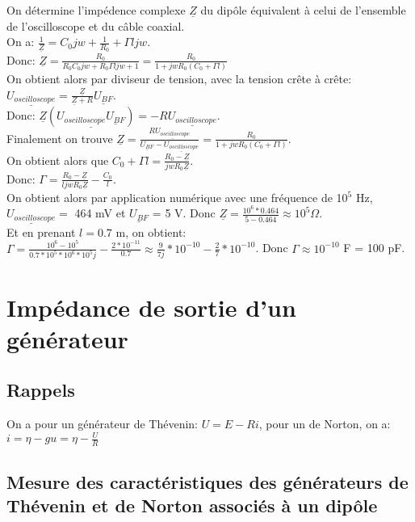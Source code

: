 \documentclass{scrartcl}
\begin{document}
				On détermine l'impédence complexe $\underline{Z}$ du dipôle équivalent à celui de l'ensemble de l'oscilloscope et du câble coaxial.\\
				On a: $\frac{1}{\underline{Z}} = C_0jw + \frac{1}{R_0} + \Gamma ljw$.\\
				Donc: $\underline{Z} = \frac{R_0}{R_0 C_0 jw + R_0 \Gamma ljw + 1} = \frac{R_0}{1 + jw R_0(C_0 + \Gamma l)}$\\
				On obtient alors par diviseur de tension, avec la tension crête à crête:\\
				$\underline{U_{oscilloscope}} = \frac{\underline{Z}}{\underline{Z} + R}\underline{U_{BF}}$.\\
				Donc: $\underline{Z}(\underline{U_{oscilloscope}\underline{U_{BF}}}) = -R\underline{U_{oscilloscope}}$.\\
				Finalement on trouve $\underline{Z} = \frac{R\underline{U_{oscilloscope}}}{\underline{U_{BF}} - \underline{U_{oscilloscope}}} = \frac{R_0}{1 + jwR_0(C_0 + \Gamma l)}$.\\
				On obtient alors que $C_0 + \Gamma l = \frac{R_0 - \underline{Z}}{jwR_0\underline{Z}}$.\\
				Donc: $\Gamma = \frac{R_0 - \underline{Z}}{ljwR_0\underline{Z}} - \frac{C_0}{l}$.\\
				
				On obtient alors par application numérique avec une fréquence de 10$^5$ Hz, $\underline{U_{oscilloscope}} =$ 464 mV et $\underline{U_{BF}}$ = 5 V. Donc $\underline{Z} = \frac{10^6 * 0.464}{5 - 0.464} \approx 10^5 \Omega$.\\
				Et en prenant $l = 0.7$ m, on obtient: $\Gamma = \frac{10^6 - 10^5}{0.7 * 10^5 * 10^6 * 10^5 j} - \frac{2 * 10^{-11}}{0.7} \approx \frac{9}{7j} * 10^{-10} - \frac{2}{7} * 10^{-10}$. Donc $\Gamma \approx 10^{-10}$ F = 100 pF.
			
	\section{Impédance de sortie d'un générateur}
	
		\subsection{Rappels}
			
			On a pour un générateur de Thévenin: $U = E - Ri$, pour un de Norton, on a: $i = \eta - gu = \eta - \frac{U}{R}$
			
		\subsection{Mesure des caractéristiques des générateurs de Thévenin et de Norton associés à un dipôle}
			
\end{document}
